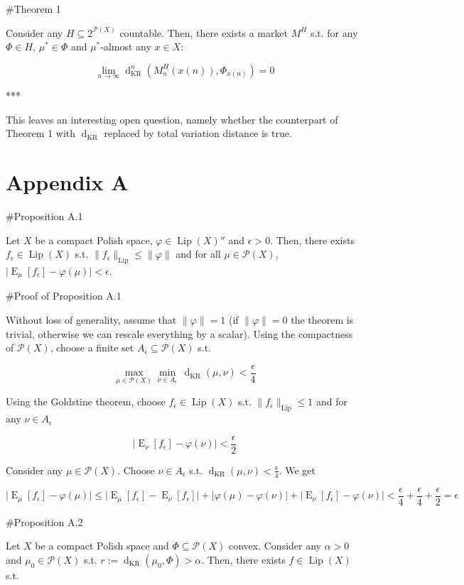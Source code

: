 \documentclass[a4paper]{article}
\DeclareMathOperator{\E}{E}
\newcommand{\Abs}[1]{\lvert #1 \rvert}
\newcommand{\Norm}[1]{\lVert #1 \rVert}
\newcommand{\Prob}{\mathcal{P}}
\newcommand{\Lip}{\operatorname{Lip}}
\newcommand{\NormL}[1]{\Norm{#1}_{\operatorname{Lip}}}
\newcommand{\Dkr}{\operatorname{d}_{\text{KR}}}
\begin{document}
\#Theorem 1

Consider any ${H \subseteq 2^{\Prob(X)}}$ countable. Then, there exists a market ${M^H}$ s.t. for any ${\Phi \in H}$, ${\mu^* \in \Phi}$ and ${\mu^*}$-almost any ${x \in X}$:

$$\lim_{n \rightarrow \infty} \Dkr^n(M^H_n(x(n)),\Phi_{x(n)}) = 0$$

***

This leaves an interesting open question, namely whether the counterpart of Theorem 1 with ${\Dkr}$ replaced by total variation distance is true.

\section{Appendix A}

\#Proposition A.1

Let $X$ be a compact Polish space, $\varphi \in \Lip(X)''$ and $\epsilon > 0$. Then, there exists $f_\epsilon \in \Lip(X)$ s.t. $\NormL{f_\epsilon} \leq \Norm{\varphi}$ and for all $\mu \in \Prob(X)$, $\Abs{\E_\mu[f_\epsilon] - \varphi(\mu)} < \epsilon$.

\#Proof of Proposition A.1

Without loss of generality, assume that $\Norm{\varphi}=1$ (if $\Norm{\varphi}=0$ the theorem is trivial, otherwise we can rescale everything by a scalar). Using the compactness of $\Prob(X)$, choose a finite set $A_\epsilon \subseteq \Prob(X)$ s.t. 

$$\max_{\mu \in \Prob(X)} \min_{\nu \in A_\epsilon}\, \Dkr(\mu,\nu) < \frac{\epsilon}{4}$$

Using the Goldstine theorem, choose $f_\epsilon \in \Lip(X)$ s.t. $\NormL{f_\epsilon} \leq 1$ and for any $\nu \in A_\epsilon$ 

$$\Abs{\E_\nu[f_\epsilon] - \varphi(\nu)} < \frac{\epsilon}{2}$$

Consider any $\mu \in \Prob(X)$. Choose $\nu \in A_\epsilon$ s.t. $\Dkr(\mu,\nu) < \frac{\epsilon}{4}$. We get

$$\Abs{\E_\mu[f_\epsilon] - \varphi(\mu)} \leq \Abs{\E_\mu[f_\epsilon] - \E_\nu[f_\epsilon]} + \Abs{\varphi(\mu) - \varphi(\nu)} + \Abs{\E_\nu[f_\epsilon] - \varphi(\nu)} < \frac{\epsilon}{4} + \frac{\epsilon}{4} + \frac{\epsilon}{2} = \epsilon$$

\#Proposition A.2

Let $X$ be a compact Polish space and $\Phi \subseteq \Prob(X)$ convex. Consider any $\alpha > 0$ and $\mu_0 \in \Prob(X)$ s.t. $r:=\Dkr(\mu_0, \Phi) > \alpha$. Then, there exists $f \in \Lip(X)$ s.t.
\end{document}
